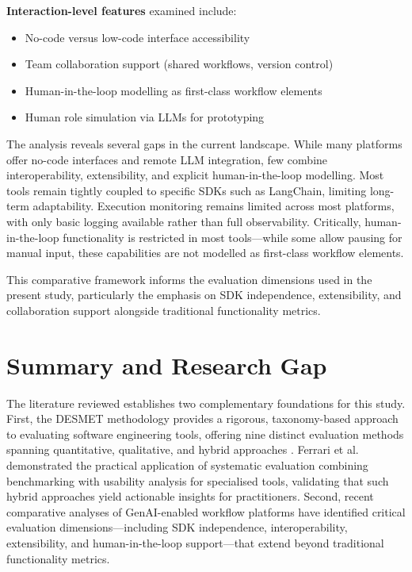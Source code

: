\documentclass[]
{UCD_CS_FYP_Report}
\begin{document}
\textbf{Interaction-level features} examined include:
\begin{itemize}
  \item No-code versus low-code interface accessibility
  \item Team collaboration support (shared workflows, version control)
  \item Human-in-the-loop modelling as first-class workflow elements
  \item Human role simulation via LLMs for prototyping
\end{itemize}

The analysis reveals several gaps in the current landscape. While many platforms offer no-code interfaces and remote LLM integration, few combine interoperability, extensibility, and explicit human-in-the-loop modelling. Most tools remain tightly coupled to specific SDKs such as LangChain, limiting long-term adaptability. Execution monitoring remains limited across most platforms, with only basic logging available rather than full observability. Critically, human-in-the-loop functionality is restricted in most tools---while some allow pausing for manual input, these capabilities are not modelled as first-class workflow elements.

This comparative framework informs the evaluation dimensions used in the present study, particularly the emphasis on SDK independence, extensibility, and collaboration support alongside traditional functionality metrics.


\section{Summary and Research Gap}

The literature reviewed establishes two complementary foundations for this study. First, the DESMET methodology provides a rigorous, taxonomy-based approach to evaluating software engineering tools, offering nine distinct evaluation methods spanning quantitative, qualitative, and hybrid approaches \cite{kitchenham1997desmet}. Ferrari et al. \cite{ferrari2021systematic} demonstrated the practical application of systematic evaluation combining benchmarking with usability analysis for specialised tools, validating that such hybrid approaches yield actionable insights for practitioners. Second, recent comparative analyses of GenAI-enabled workflow platforms \cite{broccia2025humainflow} have identified critical evaluation dimensions---including SDK independence, interoperability, extensibility, and human-in-the-loop support---that extend beyond traditional functionality metrics.
\end{document}
